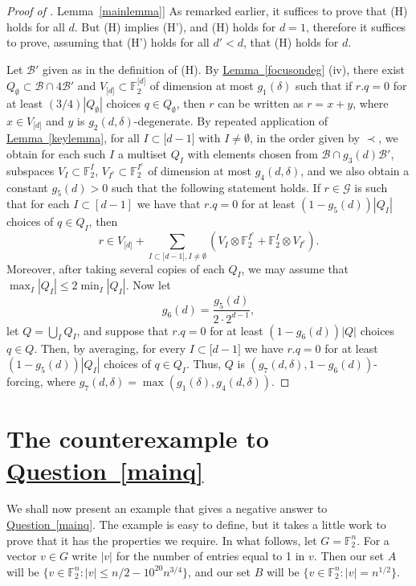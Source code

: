 \documentclass[11pt]{article}
\numberwithin{equation}{section}
\theoremstyle{definition}
\theoremstyle{plain}
\newcommand{\expref}[2]{\hyperref[#2]{#1~\ref{#2}}}
\newcommand\F{\mathbb{F}}
\renewcommand\d{\delta}
\newcommand \cB{\mathcal B}
\newcommand \cG{\mathcal G}
\newcommand \s{\subset}
\begin{document}
\begin{proof}[Proof of \expref{Lemma}{mainlemma}]
  As remarked earlier, it suffices to prove that (H) holds for all
  $d$. But (H) implies (H'), and (H) holds for $d=1$, therefore it
  suffices to prove, assuming that (H') holds for all $d'<d$, that (H)
  holds for $d$.
  
  Let $\cB'$ given as in the definition of (H). By
  \expref{Lemma}{focusondeg} (iv), there exist
  $Q_{\emptyset}\s \cB\cap 4\cB'$ and
  $V_{\lbrack d\rbrack}\s \F_2^{\lbrack d\rbrack}$ of dimension at
  most $g_1(\d)$ such that if $r.q=0$ for at least
  $({3}/{4})|Q_{\emptyset}|$ choices $q\in Q_{\emptyset}$, then $r$
  can be written as $r=x+y$, where $x\in V_{\lbrack d\rbrack}$ and $y$
  is $g_2(d,\d)$-degenerate. By repeated application of
  \expref{Lemma}{keylemma}, for all $I\s \lbrack d-1\rbrack$ with
  $I\neq \emptyset$, in the order given by $\prec$, we obtain for each
  such $I$ a multiset $Q_{I}$ with elements chosen from
  $\cB\cap g_3(d)\cB'$, subspaces $V_I\s \F_2^{I}$,
  $V_{I^c}\s \F_2^{I^c}$ of dimension at most $g_4(d,\d)$, and we also
  obtain a constant $g_5(d)>0$ such that the following statement
  holds. If $r\in \cG$ is such that for each $I\subset[d-1]$ we have
  that $r.q=0$ for at least $(1-g_5(d))|Q_I|$ choices of $q\in Q_I$,
  then
  \[
    r\in V_{\lbrack d\rbrack}+\sum_{I\s \lbrack d-1\rbrack,I\neq \emptyset} (V_I\otimes \F_2^{I^c}+\F_2^{I}\otimes V_{I^c}).
  \]
  Moreover, after taking several copies of each $Q_I$, we may assume
  that $\max_I |Q_I|\leq 2\min_{I} |Q_I|$. Now let
  \[
    g_6(d)=\frac{g_5(d)}{2\cdot 2^{d-1}},
  \]
  let $Q=\bigcup_{I}Q_I$, and suppose that $r.q=0$ for at least
  $(1-g_6(d))|Q|$ choices $q\in Q$. Then, by averaging, for every
  $I\s \lbrack d-1\rbrack$ we have $r.q=0$ for at least
  $(1-g_5(d))|Q_I|$ choices of $q\in Q_I$. Thus, $Q$ is
  $(g_7(d,\d),1-g_6(d))$-forcing, where
  $g_7(d,\d)=\max(g_1(\d),g_4(d,\d))$.
\end{proof}


\section{The counterexample to \expref{Question}{mainq}}

We shall now present an example that gives a negative answer to \expref{Question}{mainq}. The example is easy to define, but it takes a little work to prove that it has the properties we require. In what follows, let $G=\F_2^n$. For a vector $v\in G$ write $|v|$ for the number of entries equal to 1 in $v$. Then our set $A$ will be $\{v\in \F_2^n:|v|\leq n/2-10^{20}n^{3/4}\}$, and our set $B$ will be $\{v\in \F_2^n:|v|=n^{1/2}\}$. 
\end{document}
